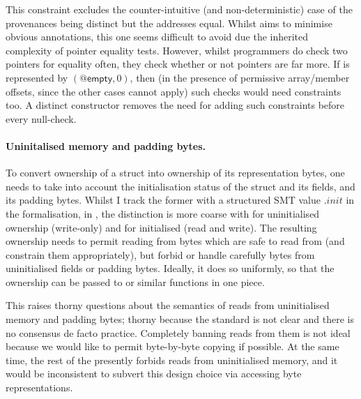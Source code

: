 This constraint excludes the counter-intuitive (and non-deterministic) case
of the provenances being distinct but the addresses equal.
Whilst  aims to minimise obvious annotations, this one seems difficult
to avoid due the inherited complexity of pointer equality tests. However,
whilst programmers do check two pointers for equality often, they check
whether or not pointers are  far more. If  is
represented by $(@\mathsf{empty}, 0)$, then (in the presence of permissive
array/member offsets, since the other cases cannot apply) such checks would
need constraints too. A distinct  constructor removes the need
for adding such constraints before every null-check.

\paragraph{Uninitalised memory and padding bytes.}%
To convert ownership of a struct into ownership of its representation bytes,
one needs to take into account the initialisation status of the struct and its
fields, and its padding bytes. Whilst I track the former with a structured SMT
value $.\mathit{init}$ in the formalisation, in , the distinction is
more coarse with  for uninitialised ownership (write-only) and
 for initialised (read and write). The resulting ownership
needs to permit reading from bytes which are safe to read from (and constrain
them appropriately), but forbid or handle carefully bytes from uninitialised
fields or padding bytes. Ideally, it does so uniformly, so that the ownership
can be passed to  or similar functions in one piece.

This raises thorny questions about the semantics of reads from uninitialised
memory and padding bytes; thorny because the  standard is not clear and
there is no consensus de facto practice. Completely banning reads from them is
not ideal because we would like to permit byte-by-byte copying if possible. At
the same time, the rest of the  presently forbids reads from
uninitialised memory, and it
would be inconsistent to subvert this design choice via accessing byte
representations.


